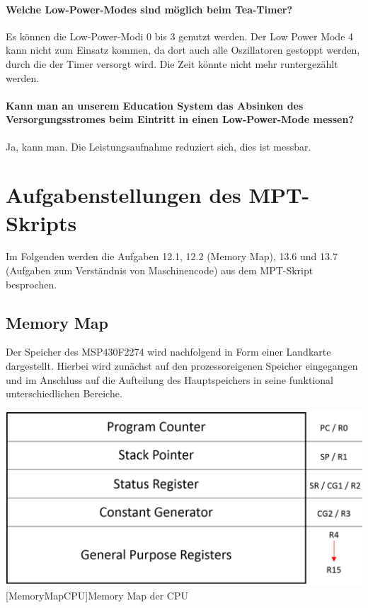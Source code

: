 \documentclass[12pt,a4paper,bibliography=totocnumbered,listof=totocnumbered]{scrartcl}
\begin{document}
\paragraph{Welche Low-Power-Modes sind möglich beim Tea-Timer?}
Es können die Low-Power-Modi 0 bis 3 genutzt werden. Der Low Power Mode 4 kann nicht zum Einsatz kommen, da dort auch alle Oszillatoren gestoppt werden, durch die der Timer versorgt wird. Die Zeit könnte nicht mehr runtergezählt werden.

\paragraph{Kann man an unserem Education System das Absinken des Versorgungsstromes beim Eintritt in einen Low-Power-Mode messen?} Ja, kann man. Die Leistungsaufnahme reduziert sich, dies ist messbar. 

\pagebreak
\section{Aufgabenstellungen des MPT-Skripts}
Im Folgenden werden die Aufgaben 12.1, 12.2 (Memory Map), 13.6 und 13.7 (Aufgaben zum Verständnis von Maschinencode) aus dem MPT-Skript besprochen.

\subsection{Memory Map}
Der Speicher des MSP430F2274 wird nachfolgend in Form einer Landkarte dargestellt. Hierbei wird zunächst auf den prozessoreigenen Speicher eingegangen und im Anschluss auf die Aufteilung des Hauptspeichers in seine funktional unterschiedlichen Bereiche.

\vspace{1em}
\begin{minipage}{\linewidth}
	\centering
	\includegraphics[width=0.7\linewidth]{img/MemoryMapCPU.png}
	[MemoryMapCPU]{Memory Map der CPU}
	\label{fig:MemoryMapCPU}
\end{minipage}
\vspace{0.5em}
\end{document}
